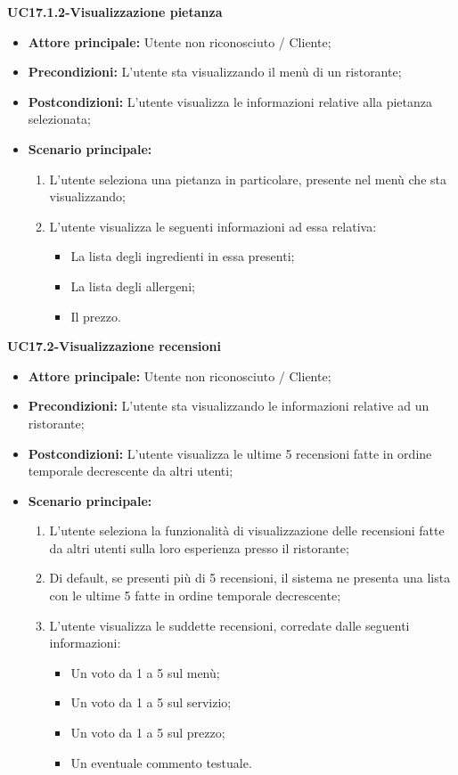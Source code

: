 \textbf{UC17.1.2-Visualizzazione pietanza}
\begin{itemize}
\item \textbf{Attore principale:} Utente non riconosciuto / Cliente;
\item \textbf{Precondizioni:} L'utente sta visualizzando il menù di un ristorante;
\item \textbf{Postcondizioni:} L'utente visualizza le informazioni relative alla pietanza selezionata;
\item \textbf{Scenario principale:}
\begin{enumerate}
    \item L'utente seleziona una pietanza in particolare, presente nel menù che sta visualizzando;
    \item L'utente visualizza le seguenti informazioni ad essa relativa:
    \begin{itemize}
        \item La lista degli ingredienti in essa presenti;
        \item La lista degli allergeni;
        \item Il prezzo.
    \end{itemize}
\end{enumerate}
\end{itemize}

\pagebreak
\textbf{UC17.2-Visualizzazione recensioni}
\begin{itemize}
\item \textbf{Attore principale:} Utente non riconosciuto / Cliente;
\item \textbf{Precondizioni:} L'utente sta visualizzando le informazioni relative ad un ristorante;
\item \textbf{Postcondizioni:} L'utente visualizza le ultime 5 recensioni fatte in ordine temporale decrescente da altri utenti;
\item \textbf{Scenario principale:}
\begin{enumerate}
    \item L'utente seleziona la funzionalità di visualizzazione delle recensioni fatte da altri utenti sulla loro esperienza presso il ristorante;
    \item Di default, se presenti più di 5 recensioni, il sistema ne presenta una lista con le ultime 5 fatte in ordine temporale decrescente;
    \item L'utente visualizza le suddette recensioni, corredate dalle seguenti informazioni:
    \begin{itemize}
        \item Un voto da 1 a 5 sul menù;
        \item Un voto da 1 a 5 sul servizio;
        \item Un voto da 1 a 5 sul prezzo;
        \item Un eventuale commento testuale.
    \end{itemize}
\end{enumerate}
\end{itemize}


